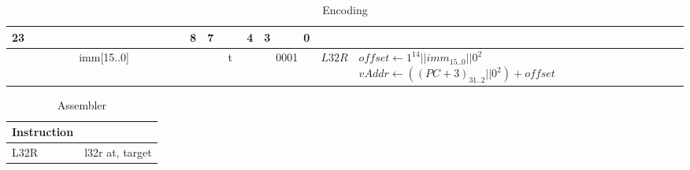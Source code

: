 	\begin{longtable}{llllllllllllllllllllllll  p{1cm}  p{7cm} | }
		\caption{Encoding\label{long}}\\
		23 & & & & & & & & & & & & & & & 8 & 7 & & & 4 & 3 & & & 0 & &
		\multicolumn{1}{c}{}\\
		\hline
		\multicolumn{16}{|c|}{imm[15..0]} & \multicolumn{4}{c|}{t} & \multicolumn{4}{c|}{0001} & \multicolumn{1}{c|}{$L32R$} & $offset \leftarrow 1^{14}||imm_{15..0}||0^2$ \newline $vAddr \leftarrow ((PC + 3)_{31..2}||0^2) + offset$\\ \hline
	\end{longtable}

	\begin{longtable}{|p{5cm}|p{5cm}|}
		\caption{Assembler\label{long}}\\
		\hline
		Instruction & \\
		\hline
		L32R & l32r at, target\\ \hline
	\end{longtable}
